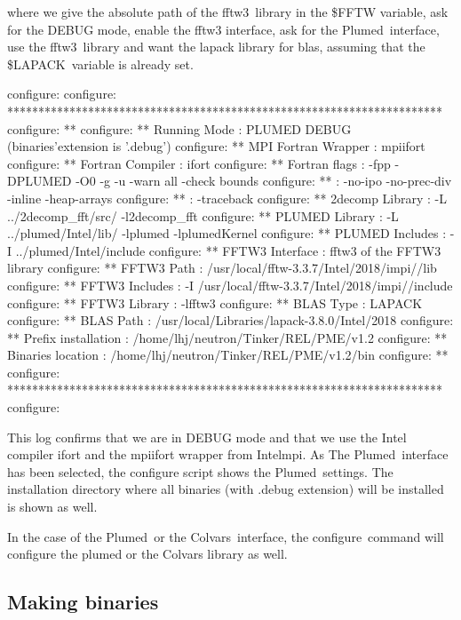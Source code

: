 where we give the absolute path of the fftw3 library in the {\ttfamily \$\-F\-F\-T\-W} variable, ask for the D\-E\-B\-U\-G mode, enable the fftw3 interface, ask for the Plumed interface, use the fftw3 library and want the lapack library for blas, assuming that the {\ttfamily \$\-L\-A\-P\-A\-C\-K} variable is already set. \begin{DoxyVerb}configure:
configure: **********************************************************************
configure: **
configure: ** Running Mode         : PLUMED DEBUG (binaries'extension is '.debug')
configure: ** MPI Fortran Wrapper  : mpiifort
configure: ** Fortran Compiler     : ifort
configure: ** Fortran flags        : -fpp -DPLUMED -O0 -g -u -warn all -check bounds  
configure: **                      : -no-ipo -no-prec-div -inline -heap-arrays 
configure: **                      : -traceback
configure: ** 2decomp Library      : -L ../2decomp_fft/src/ -l2decomp_fft
configure: ** PLUMED  Library      : -L ../plumed/Intel/lib/ -lplumed -lplumedKernel
configure: ** PLUMED  Includes     : -I ../plumed/Intel/include
configure: ** FFTW3 Interface      : fftw3 of the FFTW3 library
configure: ** FFTW3 Path           : /usr/local/fftw-3.3.7/Intel/2018/impi//lib
configure: ** FFTW3 Includes       : -I /usr/local/fftw-3.3.7/Intel/2018/impi//include
configure: ** FFTW3 Library        : -lfftw3
configure: ** BLAS Type            : LAPACK
configure: ** BLAS Path            : /usr/local/Libraries/lapack-3.8.0/Intel/2018
configure: ** Prefix installation  : /home/lhj/neutron/Tinker/REL/PME/v1.2
configure: ** Binaries location    : /home/lhj/neutron/Tinker/REL/PME/v1.2/bin
configure: **
configure: **********************************************************************
configure:
\end{DoxyVerb}


This log confirms that we are in D\-E\-B\-U\-G mode and that we use the Intel compiler {\ttfamily ifort} and the {\ttfamily mpiifort} wrapper from Intelmpi. As The Plumed interface has been selected, the configure script shows the Plumed settings. The installation directory where all binaries (with {\ttfamily .debug} extension) will be installed is shown as well.

In the case of the Plumed or the Colvars interface, the {\ttfamily configure} command will configure the plumed or the Colvars library as well.

\subsection*{Making binaries}

